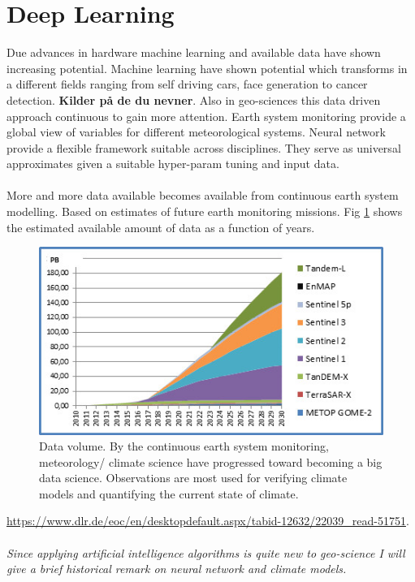 \section{Deep Learning}
Due advances in hardware machine learning and available data have shown increasing potential. Machine learning have shown potential which transforms in a different fields ranging from self driving cars, face generation to cancer detection. \textbf{Kilder på de du nevner}. Also in geo-sciences this data driven approach continuous to gain more attention. Earth system monitoring provide a global view of variables for different meteorological systems. Neural network provide a flexible framework suitable across disciplines. They serve as universal approximates given a suitable hyper-param tuning and input data.
\\ \\ 
More and more data available becomes available from continuous earth system modelling. Based on estimates of future earth monitoring missions. Fig \ref{fig:data_volum_sat} shows the estimated available amount of data as a function of years.
\begin{figure}
    \centering
    \includegraphics{Chapter1_Intro/Datenvolumen_D-SDA.jpg}
    \caption{Data volume. By the continuous earth system monitoring, meteorology/ climate science have progressed toward becoming a big data science. Observations are most used for verifying climate models and quantifying the current state of climate. }
    \label{fig:data_volum_sat}
\end{figure}
\href{https://www.dlr.de/eoc/en/desktopdefault.aspx/tabid-12632/22039_read-51751}{https://www.dlr.de/eoc/en/desktopdefault.aspx/tabid-12632/22039_read-51751}.
\\ \\ 
\textit{Since applying artificial intelligence algorithms is quite new to geo-science I will give a brief historical remark on neural network and climate models.}
